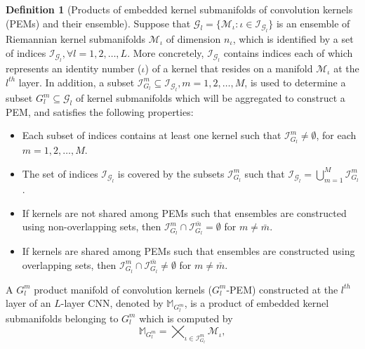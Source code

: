 \documentclass[10pt,journal,compsoc]{IEEEtran}
\theoremstyle{definition}
\newtheorem{definition}[theorem]{Definition}
\theoremstyle{definition}
\theoremstyle{remark}
\theoremstyle{remark}
\theoremstyle{remark}
\begin{document}
\begin{definition}[Products of embedded kernel submanifolds of convolution kernels (PEMs) and their ensemble] 
	Suppose that ${\mathcal{G}_l = \{ \mathcal{M}_{\iota}: \iota \in \mathcal{I}_{\mathcal{G}_l} \}}$ is an ensemble of Riemannian kernel submanifolds $\mathcal{M}_{\iota}$ of dimension $n_{\iota}$, which is identified by a set of indices $\mathcal{I}_{\mathcal{G}_l}, \forall {l=1,2,\ldots,L}$. More concretely, $\mathcal{I}_{\mathcal{G}_l}$ contains indices each of which represents an identity number ($\iota$) of a kernel that resides on a manifold $\mathcal{M}_{\iota}$ at the $l^{th}$ layer. In addition, a subset ${\mathcal{I}_{{G}_l}^m \subseteq \mathcal{I}_{\mathcal{G}_l}}, {m =1,2,\ldots,M}$, is used to determine a subset ${G}^m_l \subseteq \mathcal{G}_l$ of kernel submanifolds  which will be aggregated to construct a PEM, and satisfies the following properties:
	\begin{itemize}
	\item Each subset of indices contains at least one kernel such that ${\mathcal{I}_{{G}_l}^m} \neq \emptyset$, for each $m=1,2,\ldots,M$.	
	\item The set of indices $\mathcal{I}_{\mathcal{G}_l}$ is covered by the subsets ${\mathcal{I}_{{G}_l}^m}$ such that $\mathcal{I}_{\mathcal{G}_l} = \bigcup \limits _{m=1} ^M {\mathcal{I}_{{G}_l}^m}$. 
	\item If kernels are not shared among PEMs such that ensembles are constructed using non-overlapping sets, then $\mathcal{I}_{G_l}^m \cap \mathcal{I}_{{G}_l}^{\bar{m}} = \emptyset$ for $m \neq \bar{m}$.
	\item If kernels are shared among PEMs such that ensembles are constructed using overlapping sets, then ${\mathcal{I}_{G_l}^m \cap \mathcal{I}_{{G}_l}^{\bar{m}} \neq \emptyset}$ for $m \neq \bar{m}$.
	\end{itemize} 
	A $G^m_l$ product manifold of convolution kernels ($G^m_l$-PEM) constructed at the $l^{th}$ layer of an $L$-layer CNN, denoted by $\mathbb{M}_{G^m_l}$, is a product of embedded kernel submanifolds belonging to ${G}^m_l$ which is computed by
\begin{equation}
\mathbb{M}_{G^m_l} = \bigtimes_{\iota \in \mathcal{I}^m_{{G}_l}} \mathcal{M}_{\iota} ,

\end{equation}
\end{definition}
\end{document}
